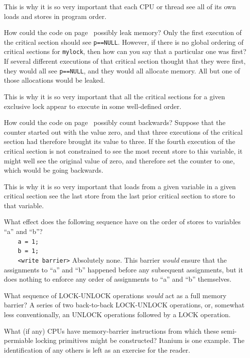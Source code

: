 	This is why it is so very important that each CPU or thread
	see all of its own loads and stores in program order.

\QuickQ{}
	How could the code on
	page~\pageref{codesample:advsync:What Can You Count On? 2}
	possibly leak memory?
\QuickA{}
	Only the first execution of the critical section should
	see {\tt p==NULL}.
	However, if there is no global ordering of critical sections for
	{\tt mylock}, then how can you say that a particular one was
	first?
	If several different executions of that critical section thought
	that they were first, they would all see {\tt p==NULL}, and
	they would all allocate memory.
	All but one of those allocations would be leaked.
	
	This is why it is so very important that all the critical sections
	for a given exclusive lock appear to execute in some well-defined
	order.

\QuickQ{}
	How could the code on
	page~\pageref{codesample:advsync:What Can You Count On? 2}
	possibly count backwards?
\QuickA{}
	Suppose that the counter started out with the value zero,
	and that three executions of the critical section had therefore
	brought its value to three.
	If the fourth execution of the critical section is not constrained
	to see the most recent store to this variable, it might well see
	the original value of zero, and therefore set the counter to
	one, which would be going backwards.
	
	This is why it is so very important that loads from a given variable
	in a given critical
	section see the last store from the last prior critical section to
	store to that variable.

\QuickQ{}
	What effect does the following sequence have on the
	order of stores to variables ``a'' and ``b''? \\
	{\tt ~~~~a = 1;} \\
	{\tt ~~~~b = 1;} \\
	{\tt ~~~~<write barrier>}
\QuickA{}
	Absolutely none.  This barrier {\em would} ensure that the
	assignments to ``a'' and ``b'' happened before any subsequent
	assignments, but it does nothing to enforce any order of
	assignments to ``a'' and ``b'' themselves.

\QuickQ{}
	What sequence of LOCK-UNLOCK operations \emph{would}
	act as a full memory barrier?
\QuickA{}
	A series of two back-to-back LOCK-UNLOCK operations, or, somewhat
	less conventionally, an UNLOCK operations followed by a LOCK
	operation.

\QuickQ{}
	What (if any) CPUs have memory-barrier instructions
	from which these semi-permiable locking primitives might
	be constructed?
\QuickA{}
	Itanium is one example.
	The identification of any others is left as an
	exercise for the reader.

